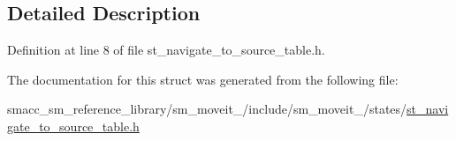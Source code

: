 \subsection{Detailed Description}


Definition at line 8 of file st\+\_\+navigate\+\_\+to\+\_\+source\+\_\+table.\+h.



The documentation for this struct was generated from the following file\+:\begin{DoxyCompactItemize}
\item 
smacc\+\_\+sm\+\_\+reference\+\_\+library/sm\+\_\+moveit\+\_/include/sm\+\_\+moveit\+\_/states/\hyperlink{st__navigate__to__source__table_8h}{st\+\_\+navigate\+\_\+to\+\_\+source\+\_\+table.\+h}\end{DoxyCompactItemize}
